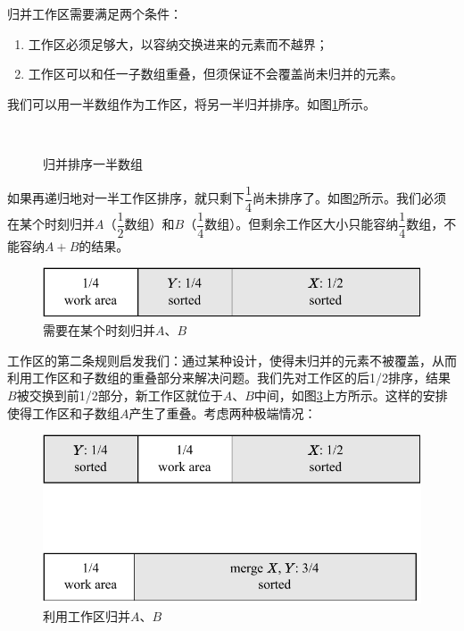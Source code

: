 \documentclass[b5paper]{ctexart}
\begin{document}
归并工作区需要满足两个条件：

\begin{enumerate}
\item 工作区必须足够大，以容纳交换进来的元素而不越界；
\item 工作区可以和任一子数组重叠，但须保证不会覆盖尚未归并的元素。
\end{enumerate}

我们可以用一半数组作为工作区，将另一半归并排序。如图\cref{fig:merge-in-place-start}所示。

\begin{figure}[htbp]
 \centering
       \\
 \caption{归并排序一半数组}
 \label{fig:merge-in-place-start}
\end{figure}

如果再递归地对一半工作区排序，就只剩下$\dfrac{1}{4}$尚未排序了。如图\cref{fig:merge-in-place-quater}所示。我们必须在某个时刻归并$A$（$\dfrac{1}{2}$数组）和$B$（$\dfrac{1}{4}$数组）。但剩余工作区大小只能容纳$\dfrac{1}{4}$数组，不能容纳$A + B$的结果。

\begin{figure}[htbp]
 \centering
 \includegraphics[scale=0.8]{img/workarea-1}
 \caption{需要在某个时刻归并$A$、$B$}
 \label{fig:merge-in-place-quater}
\end{figure}

工作区的第二条规则启发我们：通过某种设计，使得未归并的元素不被覆盖，从而利用工作区和子数组的重叠部分来解决问题。我们先对工作区的后1/2排序，结果$B$被交换到前1/2部分，新工作区就位于$A$、$B$中间，如图\cref{fig:merge-in-place-setup}上方所示。这样的安排使得工作区和子数组$A$产生了重叠\cite{msort-in-place}。考虑两种极端情况：

\begin{figure}[htbp]
 \centering
 \includegraphics[scale=0.8]{img/workarea-2}
 \caption{利用工作区归并$A$、$B$}
 \label{fig:merge-in-place-setup}
\end{figure}
\end{document}
